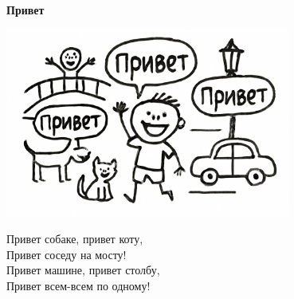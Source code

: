\vspace*{\fill}
\begin{center}
  {\huge\textbf{Привет}}

  \vspace{1.5em}
  \includegraphics[width=0.7\textwidth]{pictures/privet.png}
  \vspace{4em}
  \parbox{0.6\textwidth}{
    \LARGE
    \begin{spacing}{1.2}
      Привет собаке, привет коту,\\
      Привет соседу на мосту!\\
      Привет машине, привет столбу,\\
      Привет всем-всем по одному! %
    \end{spacing}
      
  }
\end{center}
\vspace*{\fill}